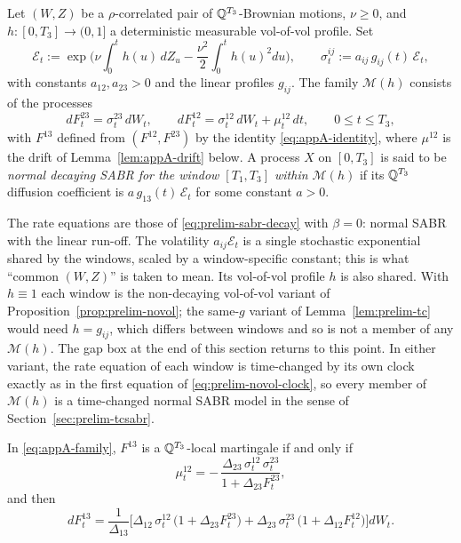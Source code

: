 \documentclass[../../main.tex]{subfiles}
\begin{document}
\begin{definition}\label{def:appA-family}
Let $(W,Z)$ be a $\rho$-correlated pair of $\mathbb{Q}^{T_3}$-Brownian motions, $\nu\ge0$, and $h:[0,T_3]\to(0,1]$ a deterministic measurable vol-of-vol profile. Set
\[
\mathcal E_t:=\exp\Big(\nu\int_0^th(u)\,dZ_u-\frac{\nu^2}{2}\int_0^th(u)^2du\Big),\qquad \sigma^{ij}_t:=a_{ij}\,g_{ij}(t)\,\mathcal E_t,
\]
with constants $a_{12},a_{23}>0$ and the linear profiles $g_{ij}$. The family $\mathcal M(h)$ consists of the processes
\begin{equation}\label{eq:appA-family}
dF^{23}_t=\sigma^{23}_t\,dW_t,\qquad dF^{12}_t=\sigma^{12}_t\,dW_t+\mu^{12}_t\,dt,\qquad 0\le t\le T_3,
\end{equation}
with $F^{13}$ defined from $(F^{12},F^{23})$ by the identity \eqref{eq:appA-identity}, where $\mu^{12}$ is the drift of Lemma~\ref{lem:appA-drift} below. A process $X$ on $[0,T_3]$ is said to be \emph{normal decaying SABR for the window $[T_1,T_3]$ within $\mathcal M(h)$} if its $\mathbb{Q}^{T_3}$ diffusion coefficient is $a\,g_{13}(t)\,\mathcal E_t$ for some constant $a>0$.
\end{definition}

The rate equations are those of \eqref{eq:prelim-sabr-decay} with $\beta=0$: normal SABR with the linear run-off. The volatility $a_{ij}\mathcal E_t$ is a single stochastic exponential shared by the windows, scaled by a window-specific constant; this is what ``common $(W,Z)$'' is taken to mean. Its vol-of-vol profile $h$ is also shared. With $h\equiv1$ each window is the non-decaying vol-of-vol variant of Proposition~\ref{prop:prelim-novol}; the same-$g$ variant of Lemma~\ref{lem:prelim-tc} would need $h=g_{ij}$, which differs between windows and so is not a member of any $\mathcal M(h)$. The gap box at the end of this section returns to this point. In either variant, the rate equation of each window is time-changed by its own clock exactly as in the first equation of \eqref{eq:prelim-novol-clock}, so every member of $\mathcal M(h)$ is a time-changed normal SABR model in the sense of Section~\ref{sec:prelim-tcsabr}.

\begin{lemma}\label{lem:appA-drift}
In \eqref{eq:appA-family}, $F^{13}$ is a $\mathbb{Q}^{T_3}$-local martingale if and only if
\begin{equation}\label{eq:appA-mu}
\mu^{12}_t=-\,\frac{\Delta_{23}\,\sigma^{12}_t\,\sigma^{23}_t}{1+\Delta_{23}F^{23}_t},
\end{equation}
and then
\begin{equation}\label{eq:appA-dF13}
dF^{13}_t=\frac{1}{\Delta_{13}}\Big[\Delta_{12}\,\sigma^{12}_t\,\big(1+\Delta_{23}F^{23}_t\big)+\Delta_{23}\,\sigma^{23}_t\,\big(1+\Delta_{12}F^{12}_t\big)\Big]dW_t .
\end{equation}
\end{lemma}
\end{document}
